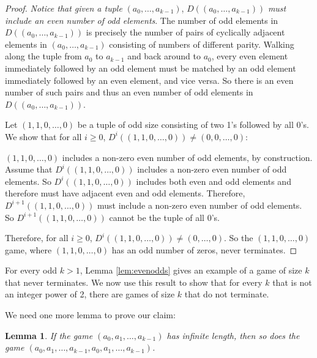 \documentclass[12pt]{amsart}
\newtheorem{lemma}[theorem]{Lemma}
\newcommand{\diff}{D}
\begin{document}
\begin{proof}
\emph{Notice that given a tuple} $(a_0, \ldots, a_{k-1})$,  $\diff ((a_0, \ldots, a_{k-1}))$ \emph{must include an even number of odd elements}. The number of odd elements in $\diff ((a_0, \ldots, a_{k-1}))$ is precisely the number of pairs of cyclically adjacent elements in  $(a_0, \ldots, a_{k-1})$ consisting of numbers of different parity. Walking along the tuple from $a_0$ to $a_{k-1}$ and back around to $a_0$, every even element immediately followed by an odd element must be matched by an odd element immediately followed by an even element, and vice versa. So there is an even number of such pairs and thus an even number of odd elements in  $\diff((a_0, \ldots, a_{k-1}))$.

Let $(1, 1, 0, \ldots, 0)$ be a tuple of odd size consisting of two 1's followed by all 0's. We show that for all $i \geq 0$, $\diff^{i}((1, 1, 0, \ldots, 0)) \neq (0, 0, \ldots, 0)$:

$(1, 1, 0, \ldots, 0)$ includes a non-zero even number of odd elements, by construction. Assume that $\diff^i((1, 1, 0, \ldots, 0))$ includes a non-zero even number of odd elements. So $\diff^i((1, 1, 0, \ldots, 0))$ includes both even and odd elements and therefore must have adjacent even and odd elements. Therefore, $\diff^{i+1}((1, 1, 0, \ldots, 0))$ must include a non-zero even number of odd elements. So  $\diff^{i+1}((1, 1, 0, \ldots, 0))$ cannot be the tuple of all $0$'s.

Therefore, for all $i \geq 0$, $\diff^i((1, 1, 0, \ldots, 0)) \neq (0, \ldots, 0)$. So the $(1, 1, 0, \ldots, 0)$ game, where $(1, 1, 0, \ldots, 0)$ has an odd number of zeros, never terminates.
\end{proof}

For every odd $k > 1$, Lemma \ref{lem:evenodds} gives an example of a game of size $k$ that never terminates. We now use this result to show that for every $k$ that is not an integer power of 2, there are games of size $k$ that do not terminate.

We need one more lemma to prove our claim:

\begin{lemma}
\label{lem:doubles}
If the game $(a_0, a_1, \ldots, a_{k-1})$ has infinite length, then so does the game $(a_0, a_1, \ldots, a_{k-1}, a_0, a_1, \ldots, a_{k-1})$.
\end{lemma}
\end{document}
